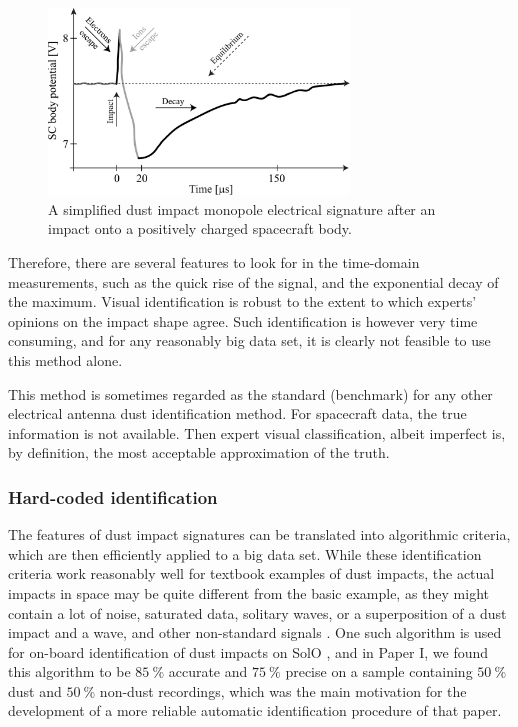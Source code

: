 \begin{figure}[h]
 	\centering
 	\includegraphics[width=8cm]{figures/impact_wf_gs.pdf}
 	\caption{A simplified dust impact monopole electrical signature after an impact onto a positively charged spacecraft body.}
 	\label{fig:impact_process}
\end{figure}

Therefore, there are several features to look for in the time-domain measurements, such as the quick rise of the signal, and the exponential decay of the maximum. Visual identification is robust to the extent to which experts' opinions on the impact shape agree. Such identification is however very time consuming, and for any reasonably big data set, it is clearly not feasible to use this method alone. 

This method is sometimes regarded as the standard (benchmark) for any other electrical antenna dust identification method. For spacecraft data, the true information is not available. Then expert visual classification, albeit imperfect is, by definition, the most acceptable approximation of the truth.

\subsubsection{Hard-coded identification}

The features of dust impact signatures can be translated into algorithmic criteria, which are then efficiently applied to a big data set. While these identification criteria work reasonably well for textbook examples of dust impacts, the actual impacts in space may be quite different from the basic example, as they might contain a lot of noise, saturated data, solitary waves, or a superposition of a dust impact and a wave, and other non-standard signals \citep{vaverka2018comparison,ye2019understanding,malaspina2023dust}. One such algorithm is used for on-board identification of dust impacts on SolO \citep{maksimovic2020solar}, and in Paper I, we found this algorithm to be $\SI{85}{\%}$ accurate and $\SI{75}{\%}$ precise on a sample containing $\SI{50}{\%}$ dust and $\SI{50}{\%}$ non-dust recordings, which was the main motivation for the development of a more reliable automatic identification procedure of that paper. 

